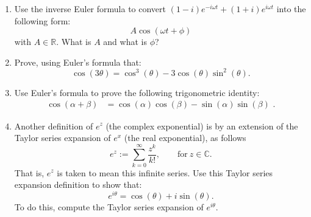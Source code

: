 \begin{enumerate}
  \item Use the inverse Euler formula to convert $(1-i) e^{-i \omega t} + (1+i) e^{i\omega t}$
        into the following form:
        \begin{equation*}
          A \cos(\omega t  + \phi)
        \end{equation*}
        with $A\in \mathbb{R}$. What is $A$ and what is $\phi$?

  \item Prove, using Euler's formula that:
        \begin{equation*}
          \cos(3\theta) = \cos^3(\theta)-3\cos(\theta)\sin^2(\theta).
        \end{equation*}

  \item Use Euler's formula to prove the following trigonometric identity:
        \begin{align*}
          \cos(\alpha + \beta) & =\cos(\alpha)\cos(\beta) - \sin(\alpha)\sin(\beta)\,\,.
        \end{align*}

  \item Another definition of $e^{z}$ (the complex exponential) is by an extension of the Taylor series
        expansion of $e^{x}$ (the real exponential), as follows
        \[e^{z} := \sum_{k=0}^{\infty}\frac{z^{k}}{k!}, \quad\quad \text{for}\ z\in\mathbb{C}.\]
        That is, $e^{z}$ is taken to mean this infinite series. Use this Taylor series expansion definition to show that:
        \begin{equation}
          e^{i\theta} = \cos(\theta) + i\sin(\theta).
          \label{ch03:euler_formula}
        \end{equation}
        To do this, compute the Taylor series expansion of $e^{i\theta}$.

\end{enumerate}
